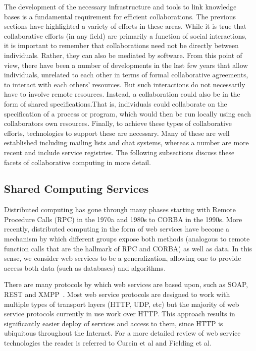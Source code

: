 \documentclass[11pt]{book}
\begin{document}
The development of the necessary infrastructure and tools to link knowledge bases is
a fundamental requirement for efficient collaborations. The previous
sections have highlighted a variety of efforts in these areas. While
it is true that collaborative efforts (in any field) are primarily a
function of social interactions, it is important to remember that
collaborations need not be directly between individuals. Rather, they
can also be mediated by software. From this point of view, there have
been a number of developments in the last few years that allow
individuals, unrelated to each other in terms of formal collaborative
agreements, to interact with each others' resources. But such
interactions do not necessarily have to involve remote
resources. Instead, a collaboration could also be in the form of
shared specifications.That is, individuals could collaborate on the
specification of a process or program, which would then be run locally
using each collaborators own resources. Finally, to achieve these
types of collaborative efforts, technologies to support these are
necessary. Many of these are well established including mailing lists
and chat systems, whereas a number are more recent and include service
registries. The following subsections discuss these facets of
collaborative computing in more detail.

\subsection{Shared Computing Services}
\label{ref:ws}

Distributed computing has gone through many phases starting with
Remote Procedure Calls (RPC) in the 1970a and 1980s to CORBA in the
1990s. More recently, distributed computing in the form of web
services have become a mechanism by which different groups expose both
methods (analogous to remote function calls that are the hallmark of
RPC and CORBA) as well as data. In this sense, we consider web
services to be a generalization, allowing one to provide access both
data (such as databases) and algorithms.

There are many protocols by which web services are based upon, such as SOAP, REST and
XMPP~\cite{Wagener2009}. Most web service protocols are designed to
work with multiple types of transport layers (HTTP, UDP, etc) but the
majority of web service protocols currently in use work over
HTTP. This approach results in significantly easier deploy of services
and access to them, since HTTP is ubiquitous throughout the
Internet. For a more detailed review of web service technologies the
reader is referred to Curcin et al\cite{Curcin:2005fk} and Fielding et
al\cite{Fielding:2002eu}.
\end{document}
